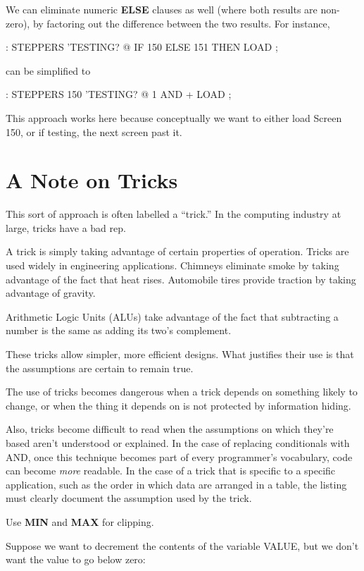 We can eliminate numeric \textbf{ELSE} clauses as well (where both results
are non-zero), by factoring out the difference between the two results. For
instance,

\begin{Code}
: STEPPERS  'TESTING? @  IF 150 ELSE 151  THEN  LOAD ;
\end{Code}
can be simplified to

\begin{Code}
: STEPPERS   150  'TESTING? @  1 AND +  LOAD ;
\end{Code}
This approach works here because conceptually we want to either load
Screen 150, or if testing, the next screen past it.

\section{A Note on Tricks}

This sort of approach is often labelled a ``trick.'' In the computing
industry at large, tricks have a bad rep.

A trick is simply taking advantage of certain properties of operation.
Tricks are used widely in engineering applications. Chimneys
eliminate smoke by taking advantage of the fact that heat rises.
Automobile tires provide traction by taking advantage of gravity.

Arithmetic Logic Units (ALUs) take advantage of the fact that
subtracting a number is the same as adding its two's complement.

These tricks allow simpler, more efficient designs. What justifies
their use is that the assumptions are certain to remain true.

The use of tricks becomes dangerous when a trick depends on something
likely to change, or when the thing it depends on is not protected by
information hiding.

Also, tricks become difficult to read when the assumptions on which
they're based aren't understood or explained. In the case of replacing
conditionals with AND, once this technique becomes part of every
programmer's vocabulary, code can become \emph{more} readable. In the case of
a trick that is specific to a specific application, such as the order in which
data are arranged in a table, the listing must clearly document the
assumption used by the trick.

\begin{tip}
Use \textbf{MIN} and \textbf{MAX} for clipping.
\end{tip}
Suppose we want to decrement the contents of the variable VALUE, but
we don't want the value to go below zero:

